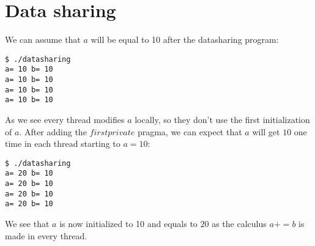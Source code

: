\chapter{Data sharing}

We can assume that $a$ will be equal to 10 after the datasharing program:
\begin{verbatim}
$ ./datasharing 
a= 10 b= 10
a= 10 b= 10
a= 10 b= 10
a= 10 b= 10
\end{verbatim}

As we see every thread modifies $a$ locally, so they don't use the first initialization of $a$.
After adding the $firstprivate$ pragma, we can expect that $a$ will get $10$ one time in each thread starting to $a = 10$:

\begin{verbatim}
$ ./datasharing 
a= 20 b= 10
a= 20 b= 10
a= 20 b= 10
a= 20 b= 10
\end{verbatim}

We see that $a$ is now initialized to 10  and equals to $20$ as the calculus $a += b$ is made in every thread.
